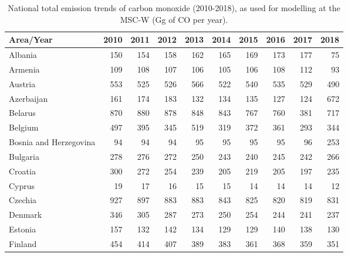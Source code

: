  \begin{table}
 \caption{National total emission trends of carbon monoxide (2010-2018), as used for modelling at the MSC-W (Gg of CO per year).}
 
 \vspace{15pt}
 
 \scriptsize
 \centering
 \begin{tabular}{|l|r|r|r|r|r|r|r|r|r|}
 \hline
                     Area/Year&   2010&   2011&   2012&   2013&   2014&   2015&   2016&   2017&   2018\\\hline\hline
                       Albania&    150&    154&    158&    162&    165&    169&    173&    177&     75\\\hline
                       Armenia&    109&    108&    107&    106&    105&    106&    108&    112&     93\\\hline
                       Austria&    553&    525&    526&    566&    522&    540&    535&    529&    490\\\hline
                    Azerbaijan&    161&    174&    183&    132&    134&    135&    127&    124&    672\\\hline
                       Belarus&    870&    880&    878&    848&    843&    767&    760&    381&    717\\\hline
                       Belgium&    497&    395&    345&    519&    319&    372&    361&    293&    344\\\hline
        Bosnia and Herzegovina&     94&     94&     94&     95&     95&     95&     95&     96&    253\\\hline
                      Bulgaria&    278&    276&    272&    250&    243&    240&    245&    242&    266\\\hline
                       Croatia&    300&    272&    254&    239&    205&    219&    205&    197&    235\\\hline
                        Cyprus&     19&     17&     16&     15&     15&     14&     14&     14&     12\\\hline
                       Czechia&    927&    897&    883&    883&    843&    825&    820&    819&    831\\\hline
                       Denmark&    346&    305&    287&    273&    250&    254&    244&    241&    237\\\hline
                       Estonia&    157&    132&    142&    134&    129&    129&    140&    138&    130\\\hline
                       Finland&    454&    414&    407&    389&    383&    361&    368&    359&    351\\\hline

\end{tabular}
\end{table}
